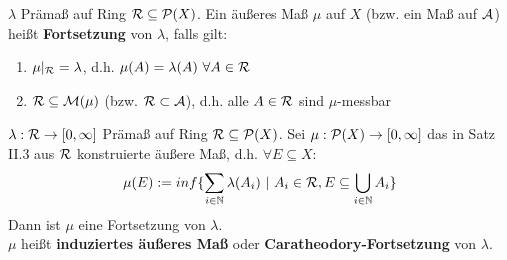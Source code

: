 \documentclass[11pt,a4paper,fleqn,openany]{report}
\begin{document}
    \begin{definition}[Im Aufschrieb II.11]
      $\lambda$ Prämaß auf Ring $\mathcal{R} \subseteq \mathcal{P}(X)$. Ein äußeres Maß $\mu$ auf $X$ (bzw. ein Maß auf $\mathcal{A}$) heißt \textbf{Fortsetzung} von $\lambda$, falls gilt:
      \begin{enumerate}[label=\roman*)]
        \item $\mu|_{\mathcal{R}} = \lambda$, d.h. $\mu(A) = \lambda(A) \ \forall A \in \mathcal{R}$
        \item $\mathcal{R} \subseteq \mathcal{M}(\mu)$ (bzw. $\mathcal{R} \subset \mathcal{A}$), d.h. alle $A \in \mathcal{R}$ sind $\mu$-messbar
      \end{enumerate}
    \end{definition}

    \begin{theorem}
      $\lambda: \mathcal{R} \to [0, \infty]$ Prämaß auf Ring $\mathcal{R} \subseteq \mathcal{P}(X)$. Sei $\mu: \mathcal{P}(X) \to [0, \infty]$ das in Satz II.3 aus $\mathcal{R}$ konstruierte äußere Maß, d.h. $\forall E \subseteq X:$
      \begin{align*}
        \mu(E) := inf\{\sum\limits_{i \in \mathbb{N}} \lambda(A_i) \ | \ A_i \in \script{R}, E \subseteq \bigcup\limits_{i \in \mathbb{N}} A_i\}
      \end{align*}
      Dann ist $\mu$ eine Fortsetzung von $\lambda$.\\
      $\mu$ heißt \textbf{induziertes äußeres Maß} oder \textbf{Caratheodory-Fortsetzung} von $\lambda$.
    \end{theorem}
\end{document}
